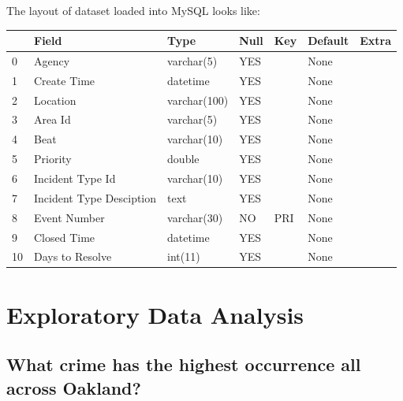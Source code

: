 \documentclass{article} %
\begin{document}
The layout of dataset loaded into MySQL looks like:

\begin{table}[H]
	\centering
	\begin{tabular}{|l|l|l|l|l|l|l|}
		\toprule
		{} &                     Field &          Type & Null &  Key & Default & Extra \\
		\midrule
		0  &                    Agency &    varchar(5) &  YES &      &    None &       \\
		1  &               Create Time &      datetime &  YES &      &    None &       \\
		2  &                  Location &  varchar(100) &  YES &      &    None &       \\
		3  &                   Area Id &    varchar(5) &  YES &      &    None &       \\
		4  &                      Beat &   varchar(10) &  YES &      &    None &       \\
		5  &                  Priority &        double &  YES &      &    None &       \\
		6  &          Incident Type Id &   varchar(10) &  YES &      &    None &       \\
		7  &  Incident Type Desciption &          text &  YES &      &    None &       \\
		8  &              Event Number &   varchar(30) &   NO &  PRI &    None &       \\
		9  &               Closed Time &      datetime &  YES &      &    None &       \\
		10 &           Days to Resolve &       int(11) &  YES &      &    None &       \\
		\bottomrule
	\end{tabular}
\end{table}

\section{Exploratory Data Analysis \textit{}}

\subsection{What crime has the highest occurrence all across Oakland?}
\end{document}
